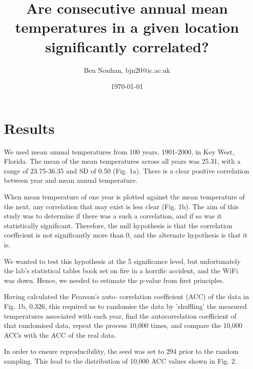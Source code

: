 \documentclass[12pt]{article}
\title{Are consecutive annual mean temperatures in a given location
significantly correlated?}
\author{Ben Nouhan, bjn20@ic.ac.uk}
\date{\today}
\begin{document}
\maketitle

\vspace{2mm} 

\setcounter{section}{3}
\section{Results}


We used mean annual temperatures from 100 years, 1901-2000, in Key West,
Florida. The mean of the mean temperatures across all years was  25.31, with a
range of 23.75-36.35 and SD of 0.50 (Fig. 1a). There is a clear positive
correlation between year and mean annual temperature.

When mean temperature of one year is plotted against 
the mean temperature of the next, any correlation that may exist is less clear 
(Fig. 1b). The aim of this study was to determine if there was a such a
correlation, and if so was it statistically significant. Therefore, the null 
hypothesis is that the correlation coefficient is not significantly more than 0, 
and the alternate hypothesis is that it is.

We wanted to test this hypothesis at the 5%
significance level, but unfortunately the lab's statistical tables book set on 
fire in a horrific accident, and the WiFi was down. Hence, we needed to estimate 
the p-value from first principles.

Having calculated the Pearson's auto-
correlation coefficient (ACC) of the data in Fig. 1b, 0.326, this required us to 
randomise the data by 'shuffling' the measured temperatures associated with each 
year, find the autocorrelation coefficient of that randomised data, repeat the 
process 10,000 times, and compare the 10,000 ACCs with the ACC of the real data. 

In order to ensure reproducibility, the seed was set to 294 prior to the 
random sampling. This lead to the distribution of 10,000 ACC values shown in 
Fig. 2.
\end{document}
